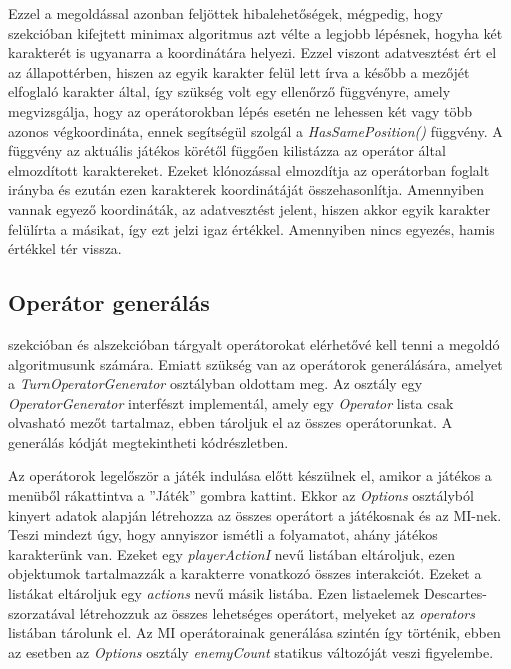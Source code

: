 \documentclass[
]{thesis-ekf}
\theoremstyle{definition}
\theoremstyle{remark}
\begin{document}
Ezzel a megoldással azonban feljöttek hibalehetőségek, mégpedig, hogy  szekcióban kifejtett minimax algoritmus azt vélte a legjobb lépésnek, hogyha két karakterét is ugyanarra a koordinátára helyezi. Ezzel viszont adatvesztést ért el az állapottérben, hiszen az egyik karakter felül lett írva a később a mezőjét elfoglaló karakter által, így szükség volt egy ellenőrző függvényre, amely megvizsgálja, hogy az operátorokban lépés esetén ne lehessen két vagy több azonos végkoordináta, ennek segítségül szolgál a \emph{HasSamePosition()} függvény. A függvény az aktuális játékos körétől függően kilistázza az operátor által elmozdított karaktereket. Ezeket klónozással elmozdítja az operátorban foglalt irányba és ezután ezen karakterek koordinátáját összehasonlítja. Amennyiben vannak egyező koordináták, az adatvesztést jelent, hiszen akkor egyik karakter felülírta a másikat, így ezt jelzi igaz értékkel. Amennyiben nincs egyezés, hamis értékkel tér vissza.

\subsection{Operátor generálás} \label{operatorgen}

 szekcióban és  alszekcióban tárgyalt operátorokat elérhetővé kell tenni a megoldó algoritmusunk számára. Emiatt szükség van az operátorok generálására, amelyet a \emph{TurnOperatorGenerator} osztályban oldottam meg. Az osztály egy \emph{OperatorGenerator} interfészt implementál, amely egy \emph{Operator} lista csak olvasható mezőt tartalmaz, ebben tároljuk el az összes operátorunkat. A generálás kódját megtekintheti  kódrészletben.

Az operátorok legelőször a játék indulása előtt készülnek el, amikor a játékos a menüből rákattintva a ''Játék'' gombra kattint. Ekkor az \emph{Options} osztályból kinyert adatok alapján létrehozza az összes operátort a játékosnak és az MI-nek. Teszi mindezt úgy, hogy annyiszor ismétli a folyamatot, ahány játékos karakterünk van. Ezeket egy \emph{playerActionI} nevű listában eltároljuk, ezen objektumok tartalmazzák a karakterre vonatkozó összes interakciót. Ezeket a listákat eltároljuk egy \emph{actions} nevű másik listába. Ezen listaelemek Descartes-szorzatával létrehozzuk az összes lehetséges operátort, melyeket az \emph{operators} listában tárolunk el. Az MI operátorainak generálása szintén így történik, ebben az esetben az \emph{Options} osztály \emph{enemyCount} statikus változóját veszi figyelembe.
\end{document}
